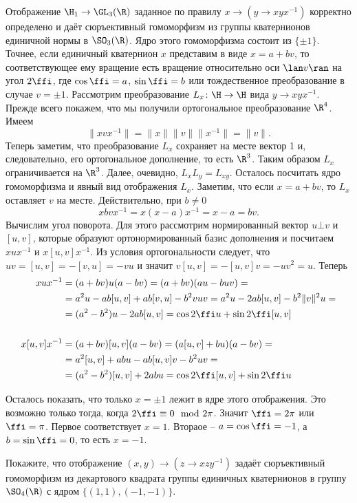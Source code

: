 \thrm Отображение $\H_{1}\to \GL_3(\R)$ заданное по правилу $x\to (y \to xyx^{-1})$ корректно определено и даёт сюръективный  гомоморфизм из группы кватернионов единичной нормы в $\SO_3(\R)$. Ядро этого гомоморфизма состоит из $\{\pm 1\}$. Точнее, если единичный кватернион $x$  представим в виде $x=a+bv$, то соответствующее ему вращение есть вращение относительно  оси $\lan v \ran$ на угол $2\ffi$, где $\cos \ffi= a$, $\sin \ffi= b$ или тождественное преобразование в случае $v=\pm 1$.
\ethrm
\proof Рассмотрим преобразование $L_x \colon \H \to \H$ вида $y \to xyx^{-1}$. Прежде всего покажем, что мы получили ортогональное преобразование $\R^4$. Имеем
 $$\|xvx^{-1}\|=\|x\| \|v\| \|x^{-1}\| = \|v\|.$$
Теперь заметим, что преобразование $L_x$ сохраняет на месте вектор 1 и, следовательно, его ортогональное дополнение, то есть $\R^3$. Таким образом $L_x$ ограничивается на $\R^3$. Далее, очевидно, $L_xL_y= L_{xy}$. Осталось посчитать ядро гомоморфизма и явный вид отображения $L_x$. Заметим, что если $x=a+bv$, то $L_x$ оставляет $v$ на месте. Действительно, при $b\neq 0$ 
$$xbvx^{-1}=x(x-a)x^{-1}= x-a=bv.$$
Вычислим угол поворота. Для этого рассмотрим нормированный вектор  $u\bot v$ и $[u,v]$, которые образуют ортонормированный базис дополнения и посчитаем $xux^{-1}$ и $x[u,v]x^{-1}$. Из условия ортогональности следует, что $uv=[u,v]=-[v,u]=-vu$ и значит $v[u,v]=-[u,v]v=-uv^2=u$. Теперь
\begin{align*}
xux^{-1}&=(a+bv)u(a-bv)= (a+bv)(au-buv)=\\
&=a^2u -ab[u,v]+ab[v,u]- b^2vuv=a^2u-2ab[u,v]-b^2\|v\|^2u=\\ &=(a^2-b^2)u-2ab[u,v]=\cos2\ffi u+ \sin 2\ffi [u,v]
\\
\\
x[u,v]x^{-1}&=(a+bv)[u,v](a-bv)= (a[u,v]+bu)(a-bv)=\\
&=a^2[u,v]+abu-ab[u,v]v-b^2uv=\\
&=(a^2-b^2)[u,v]+2abu=\cos 2\ffi[u,v]+\sin 2\ffi u
\end{align*}

Осталось показать, что только $x=\pm 1$ лежит в ядре этого отображения. Это возможно только тогда, когда $2\ffi \equiv 0 \mod 2\pi$. Значит $\ffi=2 \pi$ или $\ffi= \pi$. Первое соответствует $x=1$. Втораое --  $a=\cos \ffi = -1$, а $b=\sin \ffi = 0$, то есть $x=-1$. 
\endproof


\zd
Покажите, что отображение $(x,y) \to (z \to xzy^{-1})$ задаёт сюръективный гомоморфизм из декартового квадрата группы единичных кватернионов в группу $\SO_4(\R)$ с ядром $\{(1,1),(-1,-1)\}$.
\ezd

